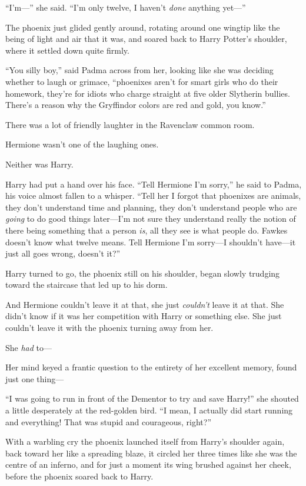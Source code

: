``I'm---'' she said. ``I'm only twelve, I haven't \emph{done} anything
yet---''

The phoenix just glided gently around, rotating around one wingtip like
the being of light and air that it was, and soared back to Harry
Potter's shoulder, where it settled down quite firmly.

``You silly boy,'' said Padma across from her, looking like she was
deciding whether to laugh or grimace, ``phoenixes aren't for smart girls
who do their homework, they're for idiots who charge straight at five
older Slytherin bullies. There's a reason why the Gryffindor colors are
red and gold, you know.''

There was a lot of friendly laughter in the Ravenclaw common room.

Hermione wasn't one of the laughing ones.

Neither was Harry.

Harry had put a hand over his face. ``Tell Hermione I'm sorry,'' he said
to Padma, his voice almost fallen to a whisper. ``Tell her I forgot that
phoenixes are animals, they don't understand time and planning, they
don't understand people who are \emph{going} to do good things
later---I'm not sure they understand really the notion of there being
something that a person \emph{is}, all they see is what people do.
Fawkes doesn't know what twelve means. Tell Hermione I'm sorry---I
shouldn't have---it just all goes wrong, doesn't it?''

Harry turned to go, the phoenix still on his shoulder, began slowly
trudging toward the staircase that led up to his dorm.

And Hermione couldn't leave it at that, she just \emph{couldn't} leave
it at that. She didn't know if it was her competition with Harry or
something else. She just couldn't leave it with the phoenix turning away
from her.

She \emph{had} to---

Her mind keyed a frantic question to the entirety of her excellent
memory, found just one thing---

``I was going to run in front of the Dementor to try and save Harry!''
she shouted a little desperately at the red-golden bird. ``I mean, I
actually did start running and everything! That was stupid and
courageous, right?''

With a warbling cry the phoenix launched itself from Harry's shoulder
again, back toward her like a spreading blaze, it circled her three
times like she was the centre of an inferno, and for just a moment its
wing brushed against her cheek, before the phoenix soared back to Harry.

